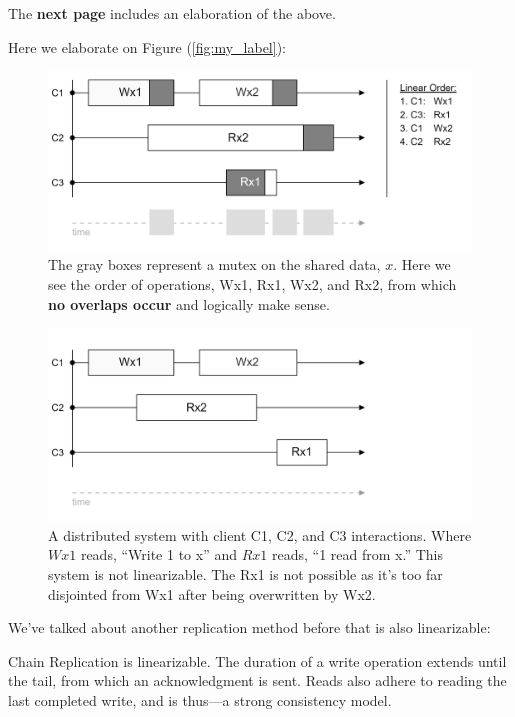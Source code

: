 \noindent
The \textbf{next page} includes an elaboration of the above.

\newpage 

\noindent
Here we elaborate on Figure (\ref{fig:my_label}):
\begin{figure}[h]
    \centering 
    \includegraphics[width=\textwidth]{Sections/consist/lin3.png}
    \caption{The gray boxes represent a mutex on the shared data, $x$. Here we see the order of operations, Wx1, Rx1, Wx2, and Rx2, from which \textbf{no overlaps occur} and logically make sense.}
\end{figure}

\begin{figure}[h]
    \centering
    \includegraphics[width=\textwidth]{Sections/consist/lin4.png}
    \caption{A distributed system with client C1, C2, and C3 interactions. Where $Wx1$ reads, ``Write 1 to x'' and $Rx1$ reads, ``1 read from x.'' This
    system is not linearizable. The Rx1 is not possible as it's too far disjointed from Wx1 after being overwritten by Wx2. }
\end{figure}

\newpage

\noindent
We've talked about another replication method before that is also linearizable:
\begin{theo}
    
    Chain Replication is linearizable. The duration of a write operation extends until 
    the tail, from which an acknowledgment is sent. Reads also adhere to reading the last completed write,
    and is thus---a strong consistency model.
\end{theo}

